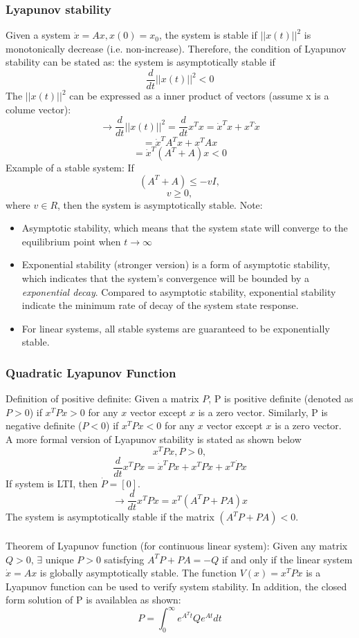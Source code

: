 \documentclass{article}
\begin{document}
\subsubsection{Lyapunov stability}
Given a system $\dot x=Ax, x(0)=x_0$, the system is stable if $||x(t)||^2$ is monotonically decrease (i.e. non-increase). Therefore, the condition of Lyapunov stability can be stated as: the system is asymptotically stable if\\
\[\frac{d}{dt}||x(t)||^2<0\]
The $||x(t)||^2$ can be expressed as a inner product of vectors (assume x is a colume vector):
\[\rightarrow \frac{d}{dt}||x(t)||^2=\frac{d}{dt}x^Tx=\dot{x}^Tx+x^T\dot{x}\]
\[=\dot{x}^TA^Tx+x^TAx\]
\[=\dot{x}^T(A^T+A)x<0\]
Example of a stable system: 
If \[(A^T+A)\leq-vI,\] 
\[v\geq 0,\]
where $v \in R$, then the system is asymptotically stable.
Note:
 \begin{itemize}
 \item Asymptotic stability, which means that the system state will converge to the equilibrium point when $t\rightarrow \infty$
 \item Exponential stability (stronger version) is a form of asymptotic stability, which indicates that the system's convergence will be bounded by a \emph{exponential decay}. Compared to asymptotic stability, exponential stability indicate the minimum rate of decay of the system state response.
 \item For linear systems, all stable systems are guaranteed to be exponentially stable.
 \end{itemize}
\subsubsection{Quadratic Lyapunov Function}
Definition of positive definite:
Given a matrix $P$, P is positive definite (denoted as $P>0$) if $x^TPx>0$ for any $x$ vector except $x$ is a zero vector. Similarly, P is negative definite ($P<0$) if $x^TPx<0$ for any $x$ vector except $x$ is a zero vector.\\
A more formal version of Lyapunov stability is stated as shown below
\[x^TPx, P>0,\]
\[\frac{d}{dt}x^TPx=\dot{x}^TPx+x^TP\dot{x}+x^T\dot{P}x\]
If system is LTI, then $\dot P=[0]$.
\[\rightarrow\frac{d}{dt}x^TPx=x^T(A^TP+PA)x\]
The system is asymptotically stable if the matrix $(A^TP+PA)<0$. \\\\
Theorem of Lyapunov function (for continuous linear system):
Given any matrix $Q>0$, $\exists$ unique $P>0$ satisfying $A^TP+PA=-Q$ if and only if the linear system $\dot{x}=Ax$ is globally asymptotically stable. The function $V(x)=x^TPx$ is a Lyapunov function can be used to verify system stability. In addition, the closed form solution of P is availablea as shown:
\[P=\int_0^\infty e^{A^Tt}Qe^{At}dt\]
\end{document}
